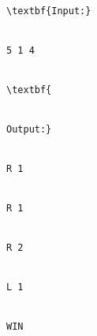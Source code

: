 \begin{verbatim}
\textbf{Input:}


5 1 4


\textbf{


Output:}


R 1


R 1


R 2


L 1


WIN








\end{verbatim}
